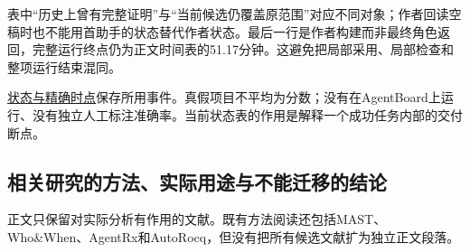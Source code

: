 表中“历史上曾有完整证明”与“当前候选仍覆盖原范围”对应不同对象；作者回读空稿时也不能用首助手的状态替代作者状态。最后一行是作者构建而非最终角色返回，完整运行终点仍为正文时间表的51.17分钟。这避免把局部采用、局部检查和整项运行结束混同。

\href{research/analysis_20260915/final_research_supplement_20260915/evidence/progress_observations.json}{状态与精确时点}保存所用事件。真假项目不平均为分数；没有在AgentBoard上运行、没有独立人工标注准确率。当前状态表的作用是解释一个成功任务内部的交付断点。

\subsection[相关研究的方法、实际用途与不能迁移的结论]{\texorpdfstring{\protect\hypertarget{u6}{}相关研究的方法、实际用途与不能迁移的结论}{相关研究的方法、实际用途与不能迁移的结论}}
正文只保留对实际分析有作用的文献。既有方法阅读还包括MAST、Who\&When、AgentRx和AutoRocq，但没有把所有候选文献扩为独立正文段落。

